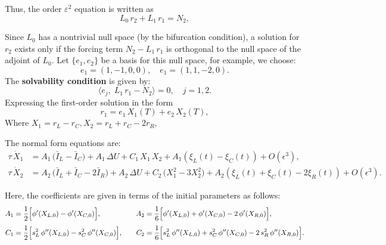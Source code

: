 \documentclass[ENG]{fancynotes}
\begin{document}
Thus, the order \(\varepsilon^2\) equation is written as
\begin{equation}
  L_0\,r_2 + L_1\,r_1 = N_2,
  \label{eq:order2_eq}
\end{equation}


Since \(L_0\) has a nontrivial null space (by the bifurcation condition), a solution for \(r_2\) exists only if the forcing term \(N_2 - L_1\,r_1\) is orthogonal to the null space of the adjoint of \(L_0\). Let \(\{e_1,e_2\}\) be a basis for this null space, for example, we choose:
\[
e_1 = (1, -1, 0, 0), \quad e_1 = (1, 1, -2, 0).
\]
The \textbf{solvability condition} is given by:
\begin{equation}
  \langle e_j,\; L_1\,r_1 - N_2 \rangle = 0,\quad j=1,2.
  \label{eq:solvability_cond}
\end{equation}
Expressing the first-order solution in the form
\[
r_1 = e_1\,X_1(T) + e_2\,X_2(T),
\]
Where $X_1 = r_L-r_C, X_2 =  r_L+r_C-2r_R, $

The normal form equations are:
\begin{align}
  \tau\,\dot{X}_1 &= A_1\,\bigl(\bar{I}_L - \bar{I}_C\bigr) + A_1\,\Delta U + C_1\,X_1\,X_2 + A_1 (\xi_L(t)-\xi_C(t)) + O(\epsilon^3), \label{eq:normal_form1}\\[2mm]
  \tau\,\dot{X}_2 &= A_2\,\bigl(\bar{I}_L + \bar{I}_C - 2\bar{I}_R\bigr) + A_2\,\Delta U + C_2\,\bigl(X_1^2 - 3X_2^2\bigr) +  A_2(\xi_L(t)+\xi_C(t)-2\xi_R(t)) + O(\epsilon^3). \label{eq:normal_form2}
\end{align}

Here, the coefficients are given in terms of the initial parameters as follows:
\[
\begin{aligned}
A_1 &= \frac{1}{2}\Bigl[\phi'(X_{L,0}) - \phi'(X_{C,0})\Bigr], \quad
& A_2 &= \frac{1}{6}\Bigl[\phi'(X_{L,0}) + \phi'(X_{C,0}) - 2\,\phi'(X_{R,0})\Bigr],\\[1mm]
C_1 &= \frac{1}{2}\Bigl[s_L^2\,\phi''(X_{L,0}) - s_C^2\,\phi''(X_{C,0})\Bigr], \quad
& C_2 &= \frac{1}{6}\Bigl[s_L^2\,\phi''(X_{L,0}) + s_C^2\,\phi''(X_{C,0}) - 2\,s_R^2\,\phi''(X_{R,0})\Bigr].
\end{aligned}
\]

\bigskip
\noindent
\end{document}
